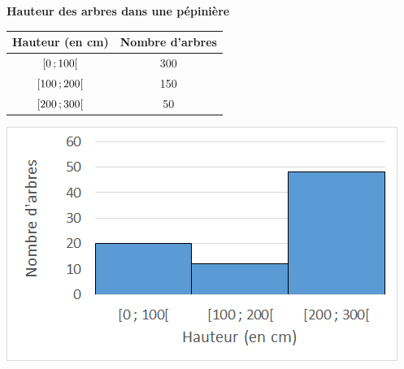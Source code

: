 
\begin{myex}
	
	\textbf{Hauteur des arbres dans une pépinière}
	
	\begin{multicols*}{2}
	
		\begin{center}
			\begin{tabular}{|@{\ }c@{\ }|@{\ }c@{\ }|}
				\hline
				Hauteur (en cm) & Nombre d'arbres \\ \hline
				$\mbox{\ensuremath{\left[0\mathpunct{};100\right[}}$ & 300  \\ \hline
				$\mbox{\ensuremath{\left[100\mathpunct{};200\right[}}$ & 150 \\ \hline
				$\mbox{\ensuremath{\left[200\mathpunct{};300\right[}}$ & 50 \\ \hline
			\end{tabular}
		\end{center}
		
		
		\includegraphics[scale=0.8]{img/histo}
	\end{multicols*}
	
\end{myex}

